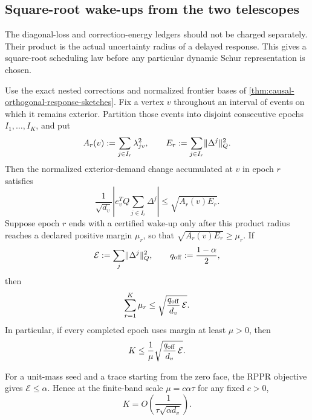 \subsection{Square-root wake-ups from the two telescopes}
\label{sec:square-root-wakeups}

The diagonal-loss and correction-energy ledgers should not be charged
separately.  Their product is the actual uncertainty radius of a delayed
response.  This gives a square-root scheduling law before any particular
dynamic Schur representation is chosen.

\begin{lemma}
\label{lem:two-ledger-square-root-wakeup}
Use the exact nested corrections and normalized frontier bases of
\cref{thm:causal-orthogonal-response-sketches}.  Fix a vertex $v$ throughout
an interval of events on which it remains exterior.  Partition those events
into disjoint consecutive epochs $I_1,\ldots,I_K$, and put
\begin{equation}
 A_r(v):=\sum_{j\in I_r}\lambda_{jv}^2,
 \qquad
 E_r:=\sum_{j\in I_r}\lVert\Delta^j\rVert_Q^2.
 \label{eq:wakeup-two-ledgers}
\end{equation}
Then the normalized exterior-demand change accumulated at $v$ in epoch $r$
satisfies
\begin{equation}
 \frac{1}{\sqrt{d_v}}
 \left|e_v^TQ\sum_{j\in I_r}\Delta^j\right|
 \leq\sqrt{A_r(v)E_r}.
 \label{eq:wakeup-product-interval}
\end{equation}
Suppose epoch $r$ ends with a certified wake-up only after this product
radius reaches a declared positive margin $\mu_r$, so that
$\sqrt{A_r(v)E_r}\geq\mu_r$.  If
\begin{equation*}
 \mathcal E:=\sum_j\lVert\Delta^j\rVert_Q^2,
 \qquad
 q_{\rm off}:=\frac{1-\alpha}{2},
\end{equation*}
then
\begin{equation}
 \sum_{r=1}^K\mu_r
 \leq
 \sqrt{\frac{q_{\rm off}}{d_v}\,\mathcal E}.
 \label{eq:wakeup-margin-budget}
\end{equation}
In particular, if every completed epoch uses margin at least $\mu>0$, then
\begin{equation}
 K\leq
 \frac{1}{\mu}
 \sqrt{\frac{q_{\rm off}}{d_v}\,\mathcal E}.
 \label{eq:wakeup-count}
\end{equation}

For a unit-mass seed and a trace starting from the zero face, the RPPR
objective gives $\mathcal E\leq\alpha$.  Hence at the finite-band scale
$\mu=c\alpha\tau$ for any fixed $c>0$,
\begin{equation}
 K=O\!\left(\frac{1}{\tau\sqrt{\alpha d_v}}\right).
 \label{eq:wakeup-product-scale}
\end{equation}
\end{lemma}

